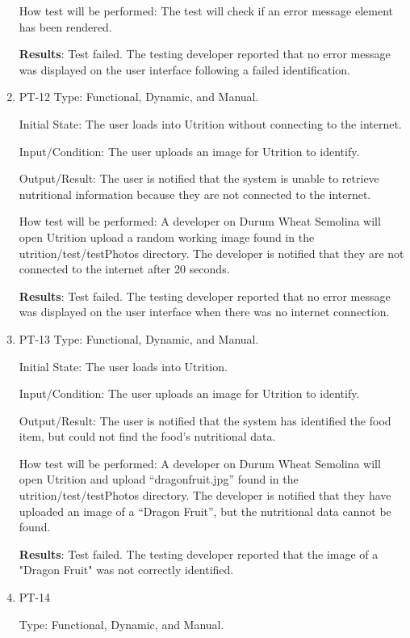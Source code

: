\documentclass[12pt, titlepage]{article}
\begin{document}
\begin{enumerate}
		How test will be performed: The test will check if an error message element has been rendered.
		
		\textbf{Results}: Test failed. The testing developer reported that no error message was displayed on the user interface following a failed identification.
		
		\item{PT-12}
		Type: Functional, Dynamic, and Manual.
		
		Initial State: The user loads into Utrition without connecting to the internet.
		
		Input/Condition: The user uploads an image for Utrition to identify.
		
		Output/Result: The user is notified that the system is unable to retrieve nutritional information because they are not connected to the internet.
		
		How test will be performed: A developer on Durum Wheat Semolina will open Utrition upload a random working image found in the utrition/test/testPhotos directory. The developer is notified that they are not connected to the internet after 20 seconds.
		
		\textbf{Results}: Test failed. The testing developer reported that no error message was displayed on the user interface when there was no internet connection. 
		
		\item{PT-13} 
		Type: Functional, Dynamic, and Manual.
		
		Initial State: The user loads into Utrition.
		
		Input/Condition: The user uploads an image for Utrition to identify.
		
		Output/Result: The user is notified that the system has identified the food item, but could not find the food’s nutritional data.
		
		How test will be performed: A developer on Durum Wheat Semolina will open Utrition and upload “dragonfruit.jpg” found in the utrition/test/testPhotos directory. The developer is notified that they have uploaded an image of a “Dragon Fruit”, but the nutritional data cannot be found.
		
		\textbf{Results}: Test failed. The testing developer reported that the image of a "Dragon Fruit" was not correctly identified.
		
		\item{PT-14} 
		
		Type: Functional, Dynamic, and Manual.
		

\end{enumerate}
\end{document}
